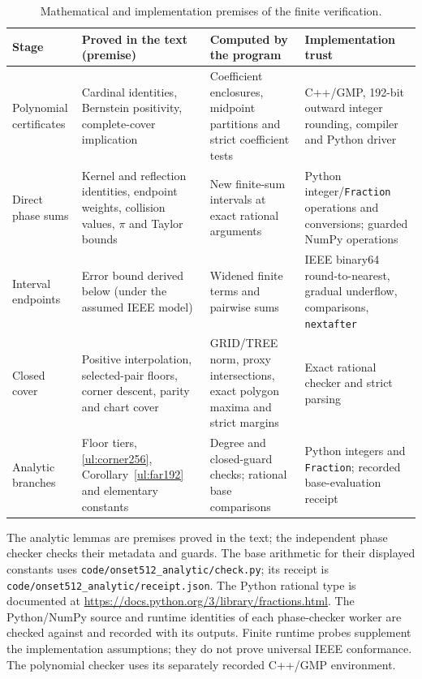 \begin{table}[htbp]
\centering\small
\caption{Mathematical and implementation premises of the finite verification.}
\label{cert:trust}
\begin{tabular}{@{}>{\raggedright\arraybackslash}p{.13\linewidth}
>{\raggedright\arraybackslash}p{.26\linewidth}
>{\raggedright\arraybackslash}p{.27\linewidth}
>{\raggedright\arraybackslash}p{.24\linewidth}@{}}
\toprule
Stage & Proved in the text (premise) & Computed by the program & Implementation trust\\\midrule
Polynomial certificates & Cardinal identities, Bernstein positivity, complete-cover implication & Coefficient enclosures, midpoint partitions and strict coefficient tests & C++/GMP, 192-bit outward integer rounding, compiler and Python driver\\
Direct phase sums & Kernel and reflection identities, endpoint weights, collision values, $\pi$ and Taylor bounds & New finite-sum intervals at exact rational arguments & Python integer/\texttt{Fraction} operations and conversions; guarded NumPy operations~\cite{NumPy2020}\\
Interval endpoints & Error bound derived below (under the assumed IEEE model) & Widened finite terms and pairwise sums & IEEE binary64 round-to-nearest, gradual underflow, comparisons, \texttt{nextafter}~\cite{IEEE7542019}\\
Closed cover & Positive interpolation, selected-pair floors, corner descent, parity and chart cover & GRID/TREE norm, proxy intersections, exact polygon maxima and strict margins & Exact rational checker and strict parsing\\
Analytic branches & Floor tiers, \eqref{ul:corner256}, Corollary~\ref{ul:far192} and elementary constants & Degree and closed-guard checks; rational base comparisons & Python integers and \texttt{Fraction}; recorded base-evaluation receipt\\
\bottomrule
\end{tabular}
\par\smallskip\footnotesize
The analytic lemmas are premises proved in the text; the independent phase checker checks their
metadata and guards. The base arithmetic for their displayed constants
uses \texttt{code/onset512\_analytic/}\allowbreak\texttt{check.py};
its receipt is \texttt{code/onset512\_analytic/}\allowbreak\texttt{receipt.json}.
The Python rational type is documented at
\url{https://docs.python.org/3/library/fractions.html}.
The Python/NumPy source and runtime identities of each phase-checker
worker are checked against
 and recorded
with its outputs. Finite runtime probes supplement the implementation
assumptions; they do not prove universal IEEE conformance.
The polynomial checker uses its separately recorded C++/GMP environment.
\end{table}


